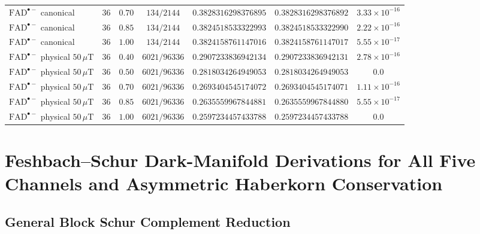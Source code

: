 \documentclass[onecolumn,10pt,notitlepage,amsmath,amssymb,floatfix]{revtex4-2}
\theoremstyle{plain}
\theoremstyle{definition}
\begin{document}
\begin{table}[htbp]
\begin{tabular}{@{}lcccccc@{}}
$\mathrm{FAD}^{\bullet-}$ canonical & $36$ & $0.70$ & $134 / 2144$ & $0.3828316298376895$ & $0.3828316298376892$ & $3.33\times 10^{-16}$ \\
$\mathrm{FAD}^{\bullet-}$ canonical & $36$ & $0.85$ & $134 / 2144$ & $0.3824518533322993$ & $0.3824518533322990$ & $2.22\times 10^{-16}$ \\
$\mathrm{FAD}^{\bullet-}$ canonical & $36$ & $1.00$ & $134 / 2144$ & $0.3824158761147016$ & $0.3824158761147017$ & $5.55\times 10^{-17}$ \\
\midrule
$\mathrm{FAD}^{\bullet-}$ physical $50\,\mu\text{T}$ & $36$ & $0.40$ & $6021 / 96336$ & $0.2907233836942134$ & $0.2907233836942131$ & $2.78\times 10^{-16}$ \\
$\mathrm{FAD}^{\bullet-}$ physical $50\,\mu\text{T}$ & $36$ & $0.50$ & $6021 / 96336$ & $0.2818034264949053$ & $0.2818034264949053$ & $0.0$ \\
$\mathrm{FAD}^{\bullet-}$ physical $50\,\mu\text{T}$ & $36$ & $0.70$ & $6021 / 96336$ & $0.2693404545174072$ & $0.2693404545174071$ & $1.11\times 10^{-16}$ \\
$\mathrm{FAD}^{\bullet-}$ physical $50\,\mu\text{T}$ & $36$ & $0.85$ & $6021 / 96336$ & $0.2635559967844881$ & $0.2635559967844880$ & $5.55\times 10^{-17}$ \\
$\mathrm{FAD}^{\bullet-}$ physical $50\,\mu\text{T}$ & $36$ & $1.00$ & $6021 / 96336$ & $0.2597234457433788$ & $0.2597234457433788$ & $0.0$ \\
\bottomrule
\end{tabular}
\end{table}

\section{Feshbach--Schur Dark-Manifold Derivations for All Five Channels and Asymmetric Haberkorn Conservation}
\label{sec:S3}

\subsection{General Block Schur Complement Reduction}
\end{document}

